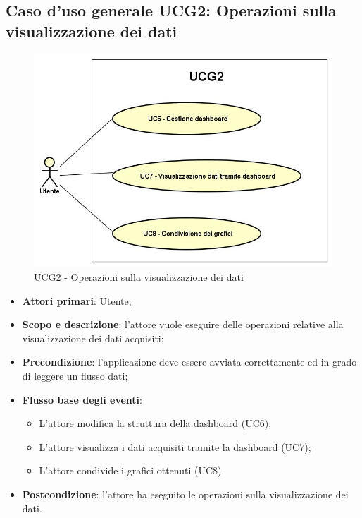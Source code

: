 \subsection{Caso d'uso generale UCG2: Operazioni sulla visualizzazione dei dati}
\begin{figure} [H]
	\centering
	\includegraphics[scale=0.5]{Img/UCG2}
	\caption{UCG2 - Operazioni sulla visualizzazione dei dati}
\end{figure}
\begin{itemize} 
	\item{\textbf{Attori primari}: Utente;}
	\item{\textbf{Scopo e descrizione}: l'attore vuole eseguire delle operazioni relative alla visualizzazione dei dati acquisiti;} 
	\item{\textbf{Precondizione}: l'applicazione deve essere avviata correttamente ed in grado di leggere un flusso dati;} 
	\item{\textbf{Flusso base degli eventi}: 
		\begin{itemize} 
			\item{L'attore modifica la struttura della dashboard (UC6);} 
			\item{L'attore visualizza i dati acquisiti tramite la dashboard (UC7);} 
			\item{L'attore condivide i grafici ottenuti (UC8)}. 
		\end{itemize} 
	} 
	\item{\textbf{Postcondizione}: l'attore ha eseguito le operazioni sulla visualizzazione dei dati.} 
\end{itemize} 
\newpage
